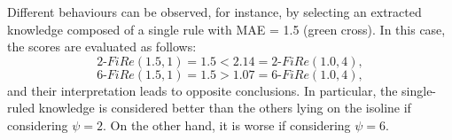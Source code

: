 \documentclass{article}
\newcommand{\fire}{FiRe}
\begin{document}
Different behaviours can be observed, for instance, by selecting an extracted knowledge composed of a single rule with MAE = 1.5 (green cross).
%
In this case, the scores are evaluated as follows:
%
\begin{equation*}
	2\textrm{-}\fire(1.5, 1)=1.5 < 2.14 = 2\textrm{-}\fire(1.0, 4),
\end{equation*}
%
\begin{equation*}
	6\textrm{-}\fire(1.5, 1)=1.5 > 1.07 = 6\textrm{-}\fire(1.0, 4),
\end{equation*}
%
and their interpretation leads to opposite conclusions.
%
In particular, the single-ruled knowledge is considered better than the others lying on the isoline if considering $\psi=2$.
%
On the other hand, it is worse if considering $\psi=6$.

\captionsetup[subfigure]{width=.25\linewidth}
\end{document}
